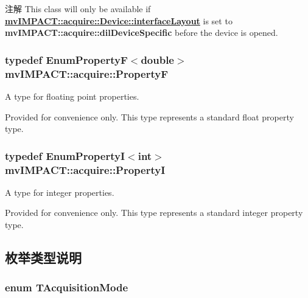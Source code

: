 \begin{DoxyNote}{注解}
This class will only be available if {\bfseries \hyperlink{classmv_i_m_p_a_c_t_1_1acquire_1_1_device_ab4dd0ecc9d456bb5ddc01d844c9d6f2d}{mv\+I\+M\+P\+A\+C\+T\+::acquire\+::\+Device\+::interface\+Layout}} is set to {\bfseries mv\+I\+M\+P\+A\+C\+T\+::acquire\+::dil\+Device\+Specific} before the device is opened. 
\end{DoxyNote}
\hypertarget{group___common_interface_gaf54865fe5a3d5cfd15f9a111b40d09f9}{
\subsubsection[{Property\+F}]{\setlength{\rightskip}{0pt plus 5cm}typedef {\bf Enum\+Property\+F}$<$double$>$ {\bf mv\+I\+M\+P\+A\+C\+T\+::acquire\+::\+Property\+F}}}\label{group___common_interface_gaf54865fe5a3d5cfd15f9a111b40d09f9}


A type for floating point properties. 

Provided for convenience only. This type represents a standard float property type. \hypertarget{group___common_interface_ga12d5e434238ca242a1ba4c6c3ea45780}{
\subsubsection[{Property\+I}]{\setlength{\rightskip}{0pt plus 5cm}typedef {\bf Enum\+Property\+I}$<$int$>$ {\bf mv\+I\+M\+P\+A\+C\+T\+::acquire\+::\+Property\+I}}}\label{group___common_interface_ga12d5e434238ca242a1ba4c6c3ea45780}


A type for integer properties. 

Provided for convenience only. This type represents a standard integer property type. 

\subsection{枚举类型说明}
\hypertarget{group___common_interface_ga712e943ac923bb84ce2f83a57b20e6b1}{
\subsubsection[{T\+Acquisition\+Mode}]{\setlength{\rightskip}{0pt plus 5cm}enum {\bf T\+Acquisition\+Mode}}}\label{group___common_interface_ga712e943ac923bb84ce2f83a57b20e6b1}



